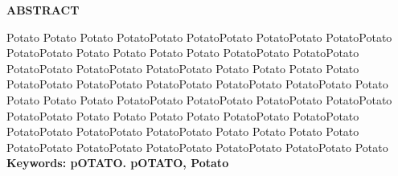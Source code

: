 \begin{center}
	\textbf{ABSTRACT}
 \end{center}
 
 \hspace{2cm}
 
 \begin{justify}
	
	Potato Potato Potato PotatoPotato PotatoPotato PotatoPotato PotatoPotato PotatoPotato Potato
	Potato Potato Potato PotatoPotato PotatoPotato PotatoPotato PotatoPotato PotatoPotato Potato
	Potato Potato Potato PotatoPotato PotatoPotato PotatoPotato PotatoPotato PotatoPotato Potato
	Potato Potato Potato PotatoPotato PotatoPotato PotatoPotato PotatoPotato PotatoPotato Potato
	Potato Potato Potato PotatoPotato PotatoPotato PotatoPotato PotatoPotato PotatoPotato Potato
	Potato Potato Potato PotatoPotato PotatoPotato PotatoPotato PotatoPotato PotatoPotato Potato\\

	 \textbf{Keywords: pOTATO. pOTATO, Potato}

 \end{justify}
 
 \thispagestyle{empty}